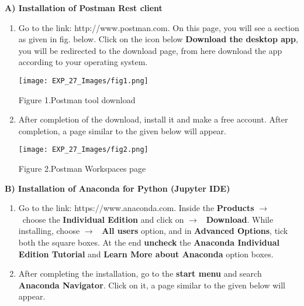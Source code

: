 \documentclass[12pt,a4paper]{article}
\begin{document}
\begin{justify}
\noindent \textbf{A)	Installation of Postman Rest client}
\vspace{-5mm}
\begin{enumerate}
\item  Go to the link: http://www.postman.com. On this page, you will see a section as given in fig. below. Click on the icon below \textbf{Download the desktop app}, you will be redirected to the download page, from here download the app according to your operating system.
\vspace{-3mm}
\begin{center} 
\texttt{[image: EXP\_27\_Images/fig1.png]}
\end{center}
\vspace{-10mm}
\begin{center} {Figure 1.Postman tool download}\end{center}
    
\item  After completion of the download, install it and make a free account.  After completion, a page similar to the given below will appear.    

\vspace{-3mm}
\begin{center} 
\texttt{[image: EXP\_27\_Images/fig2.png]}
\end{center}
\vspace{-5mm}
\begin{center} {Figure 2.Postman Workspaces page}\end{center}    
    
\end{enumerate}

\noindent \textbf{B)	Installation of Anaconda for Python (Jupyter IDE)}
\vspace{-5mm}
\begin{enumerate}
    \item Go to the link: https://www.anaconda.com. Inside the \textbf{Products} $ \rightarrow $ \ choose the \textbf{Individual Edition} and click on $ \rightarrow $ \ \textbf{Download}. While installing, choose $ \rightarrow $ \ \textbf{All users} option, and in \textbf{Advanced Options}, tick both the square boxes. At the end \textbf{uncheck} the \textbf{Anaconda Individual Edition Tutorial} and \textbf{Learn More about Anaconda} option boxes.
    \item After completing the installation, go to the \textbf{start menu} and search \textbf{Anaconda Navigator}. Click on it, a page similar to the given below will appear.


\end{enumerate}
\end{justify}
\end{document}
